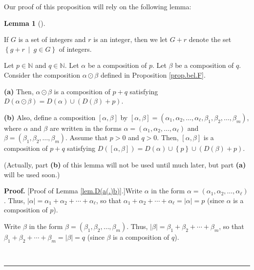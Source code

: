 \documentclass[numbers=enddot,12pt,final,onecolumn,notitlepage,abstracton]{scrartcl}%
\theoremstyle{definition}
\newtheorem{lem}[theo]{Lemma}
\newenvironment{lemma}[1][]
{\begin{lem}[#1]\begin{leftbar}}
{\end{leftbar}\end{lem}}
\newenvironment{proof}[1][Proof]{\noindent\textbf{#1.} }{\ \rule{0.5em}{0.5em}}
\newenvironment{verlong}{}{}
\begin{document}
\begin{verlong}
Our proof of this proposition will rely on the following lemma:

\begin{lemma}
\label{lem.D(a(.)b)}If $G$ is a set of integers and $r$ is an integer, then we
let $G+r$ denote the set $\left\{  g+r\ \mid\ g\in G\right\}  $ of integers.

Let $p\in\mathbb{N}$ and $q\in\mathbb{N}$. Let $\alpha$ be a composition of
$p$. Let $\beta$ be a composition of $q$. Consider the composition
$\alpha\odot\beta$ defined in Proposition \ref{prop.bel.F}.

\textbf{(a)} Then, $\alpha\odot\beta$ is a composition of $p+q$ satisfying
$D\left(  \alpha\odot\beta\right)  =D\left(  \alpha\right)  \cup\left(
D\left(  \beta\right)  +p\right)  $.

\textbf{(b)} Also, define a composition $\left[  \alpha,\beta\right]  $ by
$\left[  \alpha,\beta\right]  =\left(  \alpha_{1},\alpha_{2},\ldots
,\alpha_{\ell},\beta_{1},\beta_{2},\ldots,\beta_{m}\right)  $, where $\alpha$
and $\beta$ are written in the forms $\alpha=\left(  \alpha_{1},\alpha
_{2},\ldots,\alpha_{\ell}\right)  $ and $\beta=\left(  \beta_{1},\beta
_{2},\ldots,\beta_{m}\right)  $. Assume that $p > 0$ and $q > 0$. Then,
$\left[  \alpha,\beta\right]  $ is a composition of $p+q$ satisfying $D\left(
\left[  \alpha,\beta\right]  \right)  =D\left(  \alpha\right)  \cup\left\{
p\right\}  \cup\left(  D\left(  \beta\right)  +p\right)  $.
\end{lemma}

(Actually, part \textbf{(b)} of this lemma will not be used until much later,
but part \textbf{(a)} will be used soon.)

\begin{proof}
[Proof of Lemma \ref{lem.D(a(.)b)}.]Write $\alpha$ in the form $\alpha=\left(
\alpha_{1},\alpha_{2},\ldots,\alpha_{\ell}\right)  $. Thus, $\left\vert
\alpha\right\vert =\alpha_{1}+\alpha_{2}+\cdots+\alpha_{\ell}$, so that
$\alpha_{1}+\alpha_{2}+\cdots+\alpha_{\ell}=\left\vert \alpha\right\vert =p$
(since $\alpha$ is a composition of $p$).

Write $\beta$ in the form $\beta=\left(  \beta_{1},\beta_{2},\ldots,\beta
_{m}\right)  $. Thus, $\left\vert \beta\right\vert =\beta_{1}+\beta_{2}%
+\cdots+\beta_{m}$, so that $\beta_{1}+\beta_{2}+\cdots+\beta_{m}=\left\vert
\beta\right\vert =q$ (since $\beta$ is a composition of $q$).


\end{proof}
\end{verlong}
\end{document}
